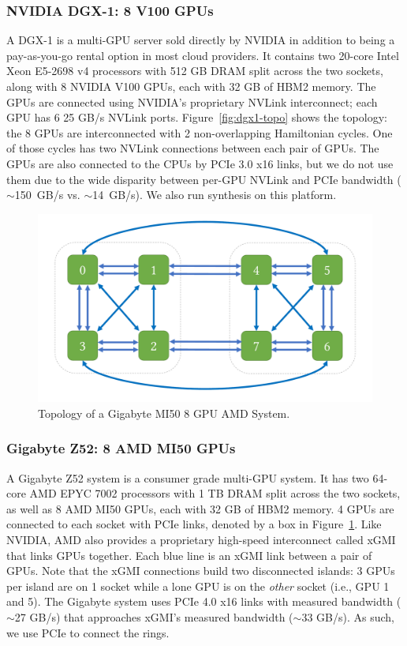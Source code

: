 \subsubsection{NVIDIA DGX-1: 8 V100 GPUs}
A DGX-1 is a multi-GPU server sold directly by NVIDIA in addition to
being a pay-as-you-go rental option in most cloud providers.  It
contains two 20-core Intel Xeon E5-2698 v4 processors with 512 GB DRAM
split across the two sockets, along with 8 NVIDIA V100 GPUs, each
with 32 GB of HBM2 memory. The GPUs are connected using NVIDIA's proprietary NVLink
interconnect; each GPU has 6 25 GB/s NVLink ports.  Figure~\ref{fig:dgx1-topo} shows the
topology: the 8 GPUs are interconnected with 2 non-overlapping
Hamiltonian cycles.  One of those cycles has two
NVLink connections between each pair of GPUs. The GPUs are also connected to the CPUs by PCIe 3.0 x16 links, but we do not use them
due to the wide disparity between per-GPU NVLink and PCIe bandwidth ($\sim$150~GB/s vs. $\sim$14~GB/s).
We also run synthesis on this platform.

\begin{figure}
\includegraphics[page=2,width=\columnwidth]{figures/topos}
\caption{Topology of a Gigabyte MI50 8 GPU AMD System.}
\label{fig:amd-topo}
\end{figure}

\subsubsection{Gigabyte Z52: 8 AMD MI50 GPUs}
A Gigabyte Z52 system is a consumer grade multi-GPU system.
It has two 64-core AMD EPYC 7002 processors with 1 TB DRAM split across the two sockets, as well as
8 AMD MI50 GPUs, each with 32 GB of HBM2 memory. 4 GPUs are connected to each socket with PCIe links, denoted by a box in Figure~\ref{fig:amd-topo}.
Like NVIDIA, AMD also provides a proprietary high-speed
interconnect called xGMI that links GPUs together.  Each blue line is
an xGMI link between a pair of GPUs.  Note that the xGMI connections
build two disconnected islands: 3 GPUs per island are on 1 socket
while a lone GPU is on the \emph{other} socket (i.e., GPU 1 and 5).
The Gigabyte system uses PCIe 4.0 x16 links with measured bandwidth ($\sim$27 GB/s)
that approaches xGMI's measured bandwidth ($\sim$33 GB/s). As such, we use PCIe to
connect the rings.

